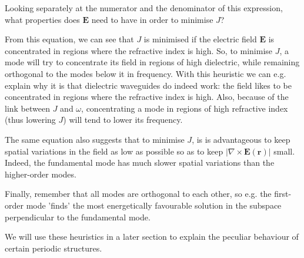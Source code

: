 \begin{cue}
Looking separately at the numerator and the denominator of this expression, what properties does ${\mathbf E}$ need to have in order to minimise $J$?   
\end{cue}

From this equation, we can see that $J$ is minimised if the electric field ${\mathbf E}$ is concentrated in regions where the refractive index is high. So, to minimise $J$, a mode will try to concentrate its field in regions of high dielectric, while remaining orthogonal to the modes below it in frequency. With this heuristic we can e.g. explain why it is that dielectric waveguides do indeed work: the field likes to be concentrated in regions where the refractive index is high. Also, because of the link between $J$ and $\omega$, concentrating a mode in regions of high refractive index (thus lowering $J$) will tend to lower its frequency.

The same equation also suggests that to minimise $J$, is is advantageous to keep spatial variations in the field as low as possible so as to keep  $\left| \nabla \times {\mathbf E({\mathbf r})} \right |$ small. Indeed, the fundamental mode has much slower spatial variations than the higher-order modes.

Finally, remember that all modes are orthogonal to each other, so e.g. the first-order mode 'finds' the most energetically favourable solution in the subspace perpendicular to the fundamental mode.

We will use these heuristics in a later section to explain the peculiar behaviour of certain periodic structures.

\pagebreak

